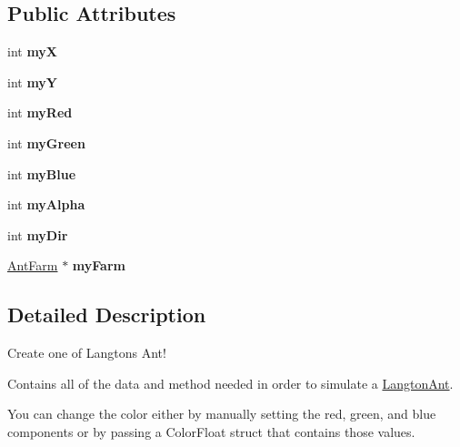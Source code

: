 \subsection*{Public Attributes}
\begin{DoxyCompactItemize}
\item 
\mbox{\label{class_langton_ant_afab907366d5000ba39ee0cded177110c}} 
int {\bfseries myX}
\item 
\mbox{\label{class_langton_ant_aa7f6eccf65908ef06dc2453a6f4f4063}} 
int {\bfseries myY}
\item 
\mbox{\label{class_langton_ant_abe7a992ac3e4a4ad14108dabc30c3ee2}} 
int {\bfseries my\+Red}
\item 
\mbox{\label{class_langton_ant_aad3f03053456bee3956a8358de57f109}} 
int {\bfseries my\+Green}
\item 
\mbox{\label{class_langton_ant_a70481e24e34cbcaf46da72d5b9c13f56}} 
int {\bfseries my\+Blue}
\item 
\mbox{\label{class_langton_ant_ab5795182669f202beacb4abe6682629b}} 
int {\bfseries my\+Alpha}
\item 
\mbox{\label{class_langton_ant_a62b83daa2325575e8079817fd8a416c5}} 
int {\bfseries my\+Dir}
\item 
\mbox{\label{class_langton_ant_a814b5625591925045665f93f08eef3f4}} 
\hyperlink{class_ant_farm}{Ant\+Farm} $\ast$ {\bfseries my\+Farm}
\end{DoxyCompactItemize}


\subsection{Detailed Description}
Create one of Langton\textquotesingle{}s Ant! 

Contains all of the data and method needed in order to simulate a \hyperlink{class_langton_ant}{Langton\+Ant}.

You can change the color either by manually setting the red, green, and blue components or by passing a Color\+Float struct that contains those values.

